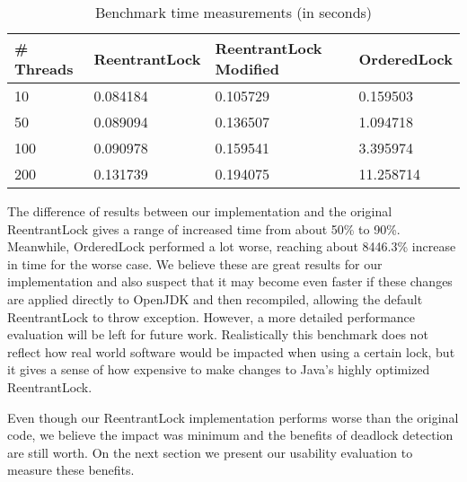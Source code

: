 \begin{table}
\begin{center}
\caption{Benchmark time measurements (in seconds)}
\begin{tabular}{|l|l|l|l|}
\hline
\# Threads & ReentrantLock & ReentrantLock Modified & OrderedLock \\
\hline
10 & 0.084184 & 0.105729 & 0.159503\\
50 & 0.089094 & 0.136507 & 1.094718\\
100 & 0.090978 & 0.159541 & 3.395974\\
200 & 0.131739 & 0.194075 & 11.258714\\
\hline
\end{tabular}
\end{center}
\end{table}

The difference of results between our implementation and the original ReentrantLock gives a range of increased time from about 50\% to 90\%. Meanwhile, OrderedLock performed a lot worse, reaching about 8446.3\% increase in time for the worse case. We believe these are great results for our implementation and also suspect that it may become even faster if these changes are applied directly to OpenJDK and then recompiled, allowing the default ReentrantLock to throw exception. However, a more detailed performance evaluation will be left for future work. Realistically this benchmark does not reflect how real world software would be impacted when using a certain lock, but it gives a sense of how expensive to make changes to Java's highly optimized ReentrantLock.

Even though our ReentrantLock implementation performs worse than the original code, we believe the impact was minimum and the benefits of deadlock detection are still worth. On the next section we present our usability evaluation to measure these benefits. 

